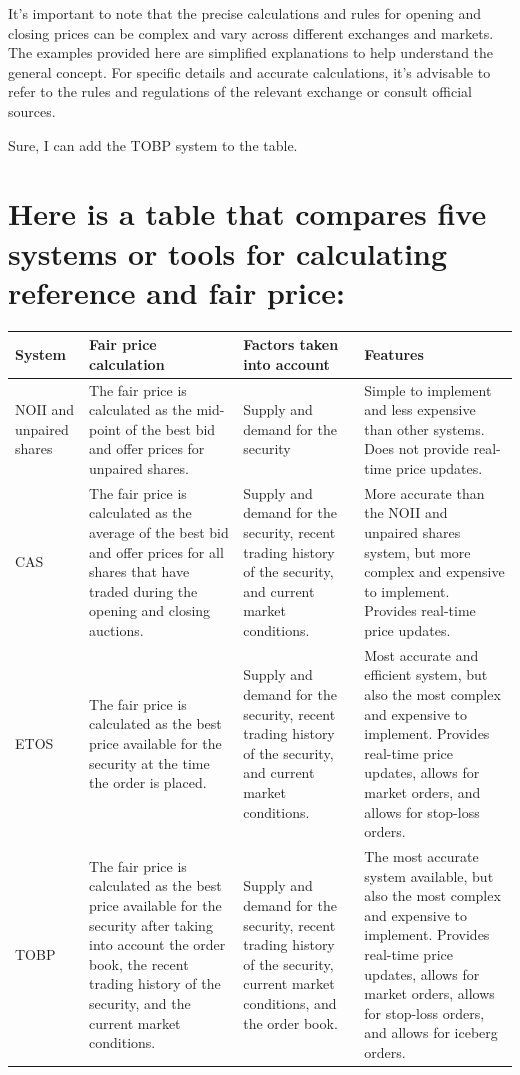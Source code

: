 \documentclass[11pt]{article}
\begin{document}
It's important to note that the precise calculations and rules for opening and closing prices
can be complex and vary across different exchanges and markets.
The examples provided here are simplified explanations to help understand the general concept.
For specific details and accurate calculations,
it's advisable to refer to the rules and regulations of the relevant exchange or consult official sources.

Sure, I can add the TOBP system to the table.

\section{Here is a table that compares five systems or tools for calculating reference and fair price:}
\label{sec:org7bdb653}

\begin{center}
\begin{tabular}{llll}
System & Fair price calculation & Factors taken into account & Features\\[0pt]
\hline
NOII and unpaired shares & The fair price is calculated as the mid-point of the best bid and offer prices for unpaired shares. & Supply and demand for the security & Simple to implement and less expensive than other systems. Does not provide real-time price updates.\\[0pt]
CAS & The fair price is calculated as the average of the best bid and offer prices for all shares that have traded during the opening and closing auctions. & Supply and demand for the security, recent trading history of the security, and current market conditions. & More accurate than the NOII and unpaired shares system, but more complex and expensive to implement. Provides real-time price updates.\\[0pt]
ETOS & The fair price is calculated as the best price available for the security at the time the order is placed. & Supply and demand for the security, recent trading history of the security, and current market conditions. & Most accurate and efficient system, but also the most complex and expensive to implement. Provides real-time price updates, allows for market orders, and allows for stop-loss orders.\\[0pt]
TOBP & The fair price is calculated as the best price available for the security after taking into account the order book, the recent trading history of the security, and the current market conditions. & Supply and demand for the security, recent trading history of the security, current market conditions, and the order book. & The most accurate system available, but also the most complex and expensive to implement. Provides real-time price updates, allows for market orders, allows for stop-loss orders, and allows for iceberg orders.\\[0pt]
\end{tabular}
\end{center}
\end{document}
